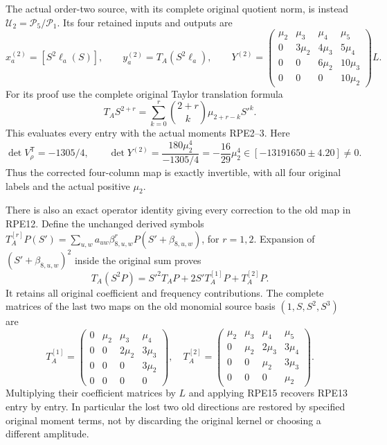 The actual order-two source, with its complete original quotient norm,
is instead $\mathcal U_2=\mathcal P_5/\mathcal P_1$.
Its four retained inputs and outputs are
\[
 x_a^{(2)}=[S^2\ell_a(S)],\qquad
 y_a^{(2)}=T_A(S^2\ell_a),\qquad
 Y^{(2)}=
 \begin{pmatrix}
 \mu_2&\mu_3&\mu_4&\mu_5\\
 0&3\mu_2&4\mu_3&5\mu_4\\
 0&0&6\mu_2&10\mu_3\\
 0&0&0&10\mu_2
 \end{pmatrix}L.
 \tag{RPE13}
\]
For its proof use the complete original Taylor translation formula
\[T_AS^{2+r}=\sum_{k=0}^r\binom{2+r}{k}\mu_{2+r-k}S'^k.\]
This evaluates every entry with the actual moments RPE2--3.
Here
\[
 \det V_\rho^{\mathsf T}=-1305/4,\qquad
 \det Y^{(2)}=\frac{180\mu_2^4}{-1305/4}
       =-\frac{16}{29}\mu_2^4
       \in[-13191650\mathbin\pm4.20]\ne0.
 \tag{RPE14}
\]
Thus the corrected four-column map is exactly invertible, with all
four original labels and the actual positive $\mu_2$.

There is also an exact operator identity giving every correction to
the old map in RPE12. Define the unchanged derived symbols
$T_A^{[r]}P(S')=\sum_{u,w}a_{uw}\beta_{8,u,w}^{r}
P(S'+\beta_{8,u,w})$, for $r=1,2$.
Expansion of $(S'+\beta_{8,u,w})^2$ inside the original sum proves
\[
 T_A(S^2P)=S'^2T_AP+2S'T_A^{[1]}P+T_A^{[2]}P.
 \tag{RPE15}
\]
It retains all original coefficient and frequency contributions.
The complete matrices of the last two maps on the old monomial
source basis $(1,S,S^2,S^3)$ are
\[
 T_A^{[1]}=
 \begin{pmatrix}0&\mu_2&\mu_3&\mu_4\\
 0&0&2\mu_2&3\mu_3\\0&0&0&3\mu_2\\0&0&0&0\end{pmatrix},
 \quad
 T_A^{[2]}=
 \begin{pmatrix}\mu_2&\mu_3&\mu_4&\mu_5\\
 0&\mu_2&2\mu_3&3\mu_4\\0&0&\mu_2&3\mu_3\\0&0&0&\mu_2\end{pmatrix}.
 \tag{RPE16}
\]
Multiplying their coefficient matrices by $L$ and applying RPE15
recovers RPE13 entry by entry. In particular the lost two old
directions are restored by specified original moment terms, not by
discarding the original kernel or choosing a different amplitude.

